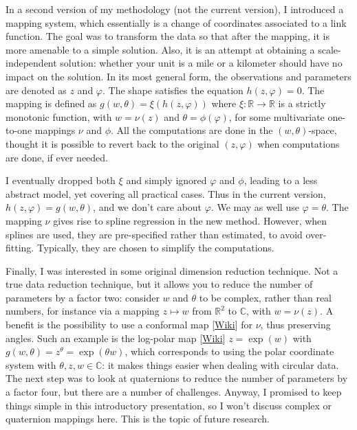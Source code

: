 \documentclass[oneside,10pt]{book}
\begin{document}
In a second version of my methodology (not the current version), I introduced a mapping system, which essentially is a change of coordinates
 associated to a link function. The
 goal was to transform the data so that after the mapping, it is more amenable to a simple solution. Also, it is an attempt at
 obtaining a scale-independent solution: whether your unit is a mile or a kilometer should have no impact on the solution. In its most general form, the observations and parameters are denoted as $z$ and $\varphi$. The shape satisfies the equation $h(z,\varphi)=0$. The mapping is defined as
$g(w,\theta)=\xi(h(z,\varphi))$ where $\xi : \mathbb{R} \rightarrow \mathbb{R}$ is a strictly monotonic function, with $w=\nu(z)$ and $\theta
 = \phi(\varphi)$, for some multivariate one-to-one mappings $\nu$ and $\phi$. All the computations are done in the $(w,\theta)$-space, thought it is possible to revert back to the original $(z,\varphi)$ when computations are done, if ever needed.

I eventually dropped both $\xi$ and simply ignored $\varphi$ and $\phi$, leading to a less abstract model, yet covering all practical cases.
Thus in the current version, $h(z,\varphi)=g(w,\theta)$, and we don't care about $\varphi$. We may as well use $\varphi=\theta$. The mapping $\nu$ gives rise to spline regression in the new method. However, when splines are used, they are pre-specified rather than estimated, to avoid over-fitting. Typically, they are chosen to simplify the computations.

Finally, I was interested in some original dimension reduction technique. Not a true data reduction technique, but it allows you to reduce the number of parameters by a factor two: consider $w$ and $\theta$ to be complex, rather than real numbers, for instance via a mapping $z \mapsto w$ from $\mathbb{R}^2$ to
$\mathbb{C}$, with $w=\nu(z)$. A benefit is the possibility to use
 a \textcolor{index}{conformal map} [\href{https://en.wikipedia.org/wiki/Conformal_map}{Wiki}] for $\nu$, thus preserving angles. Such an example is the \textcolor{index}{log-polar map} [\href{https://en.wikipedia.org/wiki/Log-polar_coordinates}{Wiki}] $z=\exp(w)$ with
$g(w,\theta)=z^\theta=\exp(\theta w)$, which corresponds to using the polar coordinate system with $\theta,z,w\in\mathbb{C}$: it makes things easier when dealing with circular data. The next step was to look at quaternions to reduce the number of parameters by a factor four, but there are a number of challenges. Anyway, I promised to keep things simple in this introductory
 presentation, so I won't discuss complex or quaternion mappings here. This is the topic of future research.
\end{document}
